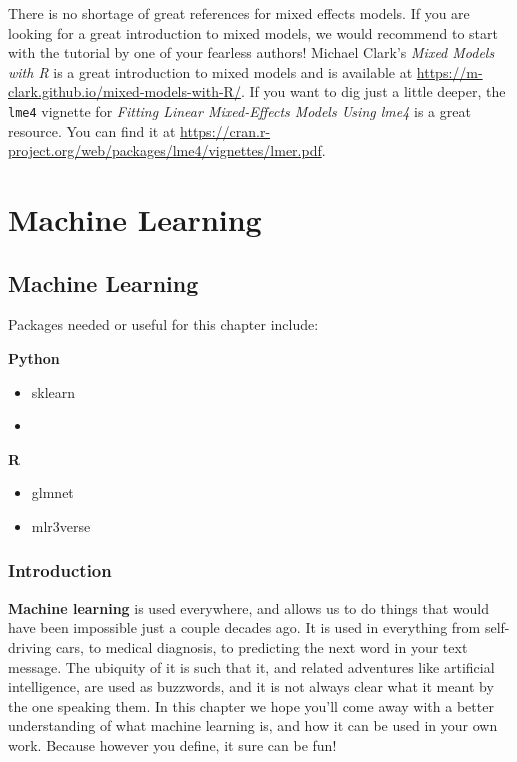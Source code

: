 \documentclass[
  letterpaper,
]{krantz}
\providecommand{\tightlist}{%
  \setlength{\itemsep}{0pt}\setlength{\parskip}{0pt}}\usepackage{longtable,booktabs,array}
\begin{document}
There is no shortage of great references for mixed effects models. If
you are looking for a great introduction to mixed models, we would
recommend to start with the tutorial by one of your fearless authors!
Michael Clark's \emph{Mixed Models with R} is a great introduction to
mixed models and is available at
\url{https://m-clark.github.io/mixed-models-with-R/}. If you want to dig
just a little deeper, the \texttt{lme4} vignette for \emph{Fitting
Linear Mixed-Effects Models Using lme4} is a great resource. You can
find it at
\url{https://cran.r-project.org/web/packages/lme4/vignettes/lmer.pdf}.

\part{Machine Learning}

\chapter{Machine Learning}\label{machine-learning-1}

Packages needed or useful for this chapter include:

\textbf{Python}

\begin{itemize}
\tightlist
\item
  sklearn
\item
\end{itemize}

\textbf{R}

\begin{itemize}
\tightlist
\item
  glmnet
\item
  mlr3verse
\end{itemize}

\section{Introduction}\label{introduction-1}

\textbf{Machine learning} is used everywhere, and allows us to do things
that would have been impossible just a couple decades ago. It is used in
everything from self-driving cars, to medical diagnosis, to predicting
the next word in your text message. The ubiquity of it is such that it,
and related adventures like artificial intelligence, are used as
buzzwords, and it is not always clear what it meant by the one speaking
them. In this chapter we hope you'll come away with a better
understanding of what machine learning is, and how it can be used in
your own work. Because however you define, it sure can be fun!
\end{document}
